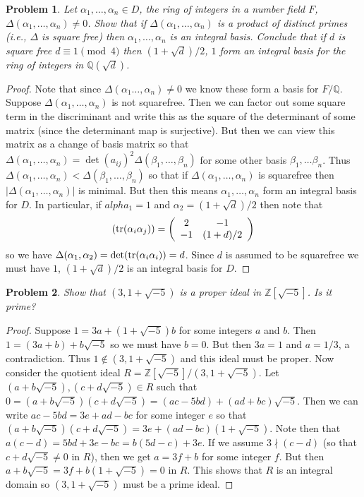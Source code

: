 \documentclass{article}
\newtheorem{problem}{Problem}
\newcommand{\tr}{\textup{tr}}
\begin{document}
\begin{problem}
Let $\alpha_1, \dots , \alpha_n \in D$, the ring of integers in a number field $F$, $\Delta(\alpha_1 , \dots , \alpha_n) \neq 0$. Show that if $\Delta(\alpha_1, \dots , \alpha_n)$ is a product of distinct primes (i.e., $\Delta$ is square free) then $\alpha_1, \dots , \alpha_n$ is an integral basis. Conclude that if $d$ is square free $d \equiv 1 \pmod{4}$ then $(1 + \sqrt{d})/2$, $1$ form an integral basis for the ring of integers in $\mathbb{Q}(\sqrt{d})$.
\end{problem}
\begin{proof}
Note that since $\Delta(\alpha_1 \dots , \alpha_n) \neq 0$ we know these form a basis for $F/\mathbb{Q}$. Suppose $\Delta(\alpha_1, \dots , \alpha_n)$ is not squarefree. Then we can factor out some square term in the discriminant and write this as the square of the determinant of some matrix (since the determinant map is surjective). But then we can view this matrix as a change of basis matrix so that $\Delta(\alpha_1, \dots , \alpha_n) = \det (a_{ij})^2 \Delta(\beta_1, \dots , \beta_n)$ for some other basis $\beta_1, \dots \beta_n$. Thus $\Delta(\alpha_1, \dots , \alpha_n) < \Delta(\beta_1, \dots , \beta_n)$ so that if $\Delta(\alpha_1, \dots , \alpha_n)$ is squarefree then $|\Delta(\alpha_1, \dots , \alpha_n)|$ is minimal. But then this means $\alpha_1, \dots , \alpha_n$ form an integral basis for $D$. In particular, if $alpha_1 = 1$ and $\alpha_2 = (1+\sqrt{d})/2$ then note that
\[
(\tr(\alpha_i \alpha_j)) = \left ( \begin{array}{cc} 2 & -1\\ -1 & (1+d)/2 \end{array} \right )
\]
so we have $\Delta(\alpha_1, \alpha_2) = \det(\tr(\alpha_i\alpha_i)) = d$. Since $d$ is assumed to be squarefree we must have $1$, $(1+\sqrt{d})/2$ is an integral basis for $D$.
\end{proof}

\begin{problem}
Show that $(3, 1 + \sqrt{-5})$ is a proper ideal in $\mathbb{Z}[\sqrt{-5}]$. Is it prime?
\end{problem}
\begin{proof}
Suppose $1 = 3a + (1 + \sqrt{-5})b$ for some integers $a$ and $b$. Then $1 = (3a + b) + b\sqrt{-5}$ so we must have $b = 0$. But then $3a = 1$ and $a = 1/3$, a contradiction. Thus $1 \notin (3, 1 + \sqrt{-5})$ and this ideal must be proper. Now consider the quotient ideal $R = \mathbb{Z}[\sqrt{-5}]/(3, 1 + \sqrt{-5})$. Let $(a + b \sqrt{-5}), (c + d \sqrt{-5}) \in R$ such that $0 = (a + b \sqrt{-5})(c + d \sqrt{-5}) = (ac - 5bd) + (ad + bc) \sqrt{-5}$. Then we can write $ac - 5bd = 3e + ad - bc$ for some integer $e$ so that $(a + b \sqrt{-5})(c + d \sqrt{-5}) = 3e + (ad-bc)(1 + \sqrt{-5})$. Note then that $a(c-d) = 5bd + 3e - bc = b(5d-c) + 3e$. If we assume $3 \nmid (c-d)$ (so that $c + d \sqrt{-5} \neq 0$ in $R$), then we get $a = 3f + b$ for some integer $f$. But then $a + b \sqrt{-5} = 3f + b(1 + \sqrt{-5}) = 0$ in $R$. This shows that $R$ is an integral domain so $(3, 1 + \sqrt{-5})$ must be a prime ideal.
\end{proof}
\end{document}
